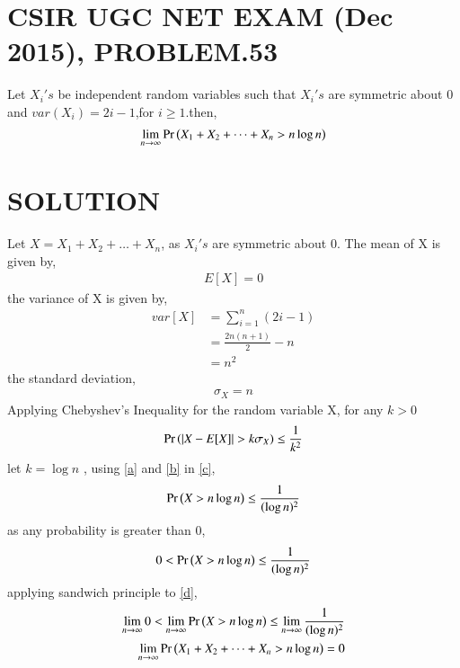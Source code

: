 \documentclass[journal,12pt,twocolumn]{IEEEtran}
\begin{document}
\section{CSIR UGC NET EXAM (Dec 2015), PROBLEM.53}
Let $X_i 's$ be independent random variables such that $X_i 's$ are symmetric about 0 and $var(X_i)=2i - 1$,for $i\geq 1$.then,
$$\lim_{n \to \infty}\Pr\left(X_1 +X_2 + \dots + X_n > n\log{n}\right)$$
\section{SOLUTION}
Let $X= X_1 +X_2 + \dots + X_n $,
as $X_i 's$ are symmetric about 0.
The mean of X is given by,
\begin{align}
E[X]=0 \label{a}
\end{align}
the variance of X is given by,
\begin{align}
var[X]&= \sum_{i=1}^{n}(2i -1)\\
   &= \frac{2n(n+1)}{2} - n\\
   &= n^{2}
\end{align}
the standard deviation,
\begin{align}
\sigma_X = n \label{b}
\end{align}
Applying Chebyshev's Inequality for the random variable X, for any $k>0$
\begin{align}
\Pr\left(\vert X-E[X]\vert> k\sigma_X\right) \leq \frac{1}{k^{2}} \label{c}
\end{align}
let $k=\log{n} $ ,
using \eqref{a} and \eqref{b} in \eqref{c},
\begin{align}
\Pr\left(X> n\log{n}\right) \leq \frac{1}{(\log{n})^{2}}
\end{align}
as any probability is greater than 0,
\begin{align}
0< \Pr\left(X> n\log{n}\right) \leq \frac{1}{(\log{n})^{2}} \label{d}
\end{align}
applying sandwich principle to \eqref{d},
\begin{align}
\lim_{n \to \infty} 0< \lim_{n \to \infty} \Pr\left(X> n\log{n}\right) \leq \lim_{n \to \infty} \frac{1}{(\log{n})^{2}}\\
\lim_{n \to \infty}\Pr\left(X_1 +X_2 + \dots + X_n > n\log{n}\right) = 0
\end{align}
\end{document}
